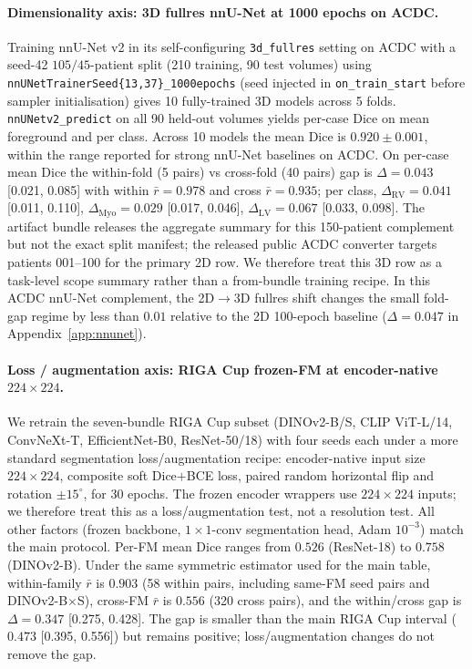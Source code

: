 \paragraph{Dimensionality axis: 3D fullres nnU-Net at 1000 epochs on ACDC.}
Training nnU-Net v2 in its self-configuring \texttt{3d\_fullres} setting on ACDC with a seed-42 $105{/}45$-patient split (210 training, 90 test volumes) using \texttt{nnUNetTrainerSeed\{13,37\}\_1000epochs} (seed injected in \texttt{on\_train\_start} before sampler initialisation) gives 10 fully-trained 3D models across 5 folds. \texttt{nnUNetv2\_predict} on all 90 held-out volumes yields per-case Dice on mean foreground and per class. Across 10 models the mean Dice is $0.920 \pm 0.001$, within the range reported for strong nnU-Net baselines on ACDC. On per-case mean Dice the within-fold (5 pairs) vs cross-fold (40 pairs) gap is $\Delta{=}0.043$ [0.021, 0.085] with within $\bar r{=}0.978$ and cross $\bar r{=}0.935$; per class, $\Delta_{\mathrm{RV}}{=}0.041$ [0.011, 0.110], $\Delta_{\mathrm{Myo}}{=}0.029$ [0.017, 0.046], $\Delta_{\mathrm{LV}}{=}0.067$ [0.033, 0.098]. The artifact bundle releases the aggregate summary for this 150-patient complement but not the exact split manifest; the released public ACDC converter targets patients 001--100 for the primary 2D row. We therefore treat this 3D row as a task-level scope summary rather than a from-bundle training recipe. In this ACDC nnU-Net complement, the 2D$\to$3D fullres shift changes the small fold-gap regime by less than $0.01$ relative to the 2D 100-epoch baseline ($\Delta{=}0.047$ in Appendix~\ref{app:nnunet}).

\paragraph{Loss / augmentation axis: RIGA Cup frozen-FM at encoder-native $224{\times}224$.}
We retrain the seven-bundle RIGA Cup subset (DINOv2-B/S, CLIP ViT-L/14, ConvNeXt-T, EfficientNet-B0, ResNet-50/18) with four seeds each under a more standard segmentation loss/augmentation recipe: encoder-native input size $224{\times}224$, composite soft Dice$+$BCE loss, paired random horizontal flip and rotation $\pm 15^\circ$, for 30 epochs. The frozen encoder wrappers use $224{\times}224$ inputs; we therefore treat this as a loss/augmentation test, not a resolution test. All other factors (frozen backbone, $1{\times}1$-conv segmentation head, Adam $10^{-3}$) match the main protocol.
Per-FM mean Dice ranges from $0.526$ (ResNet-18) to $0.758$ (DINOv2-B). Under the same symmetric estimator used for the main table, within-family $\bar r$ is $0.903$ (58 within pairs, including same-FM seed pairs and DINOv2-B$\times$S), cross-FM $\bar r$ is $0.556$ (320 cross pairs), and the within/cross gap is $\Delta{=}0.347$ [0.275, 0.428]. The gap is smaller than the main RIGA Cup interval ($0.473$ [0.395, 0.556]) but remains positive; loss/augmentation changes do not remove the gap.

